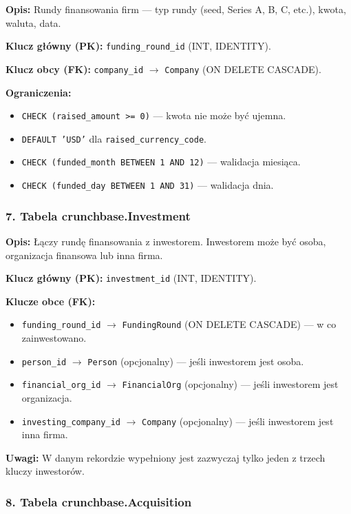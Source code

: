 \documentclass[12pt,a4paper]{article}
\begin{document}
\textbf{Opis:} Rundy finansowania firm --- typ rundy (seed, Series A, B, C, etc.), kwota, waluta, data.

\textbf{Klucz główny (PK):} \texttt{funding\_round\_id} (INT, IDENTITY).

\textbf{Klucz obcy (FK):} \texttt{company\_id} $\rightarrow$ \texttt{Company} (ON DELETE CASCADE).

\textbf{Ograniczenia:}
\begin{itemize}[noitemsep]
    \item \texttt{CHECK (raised\_amount >= 0)} --- kwota nie może być ujemna.
    \item \texttt{DEFAULT 'USD'} dla \texttt{raised\_currency\_code}.
    \item \texttt{CHECK (funded\_month BETWEEN 1 AND 12)} --- walidacja miesiąca.
    \item \texttt{CHECK (funded\_day BETWEEN 1 AND 31)} --- walidacja dnia.
\end{itemize}

\subsubsection{7. Tabela crunchbase.Investment}

\textbf{Opis:} Łączy rundę finansowania z inwestorem. Inwestorem może być osoba, organizacja finansowa lub inna firma.

\textbf{Klucz główny (PK):} \texttt{investment\_id} (INT, IDENTITY).

\textbf{Klucze obce (FK):}
\begin{itemize}[noitemsep]
    \item \texttt{funding\_round\_id} $\rightarrow$ \texttt{FundingRound} (ON DELETE CASCADE) --- w co zainwestowano.
    \item \texttt{person\_id} $\rightarrow$ \texttt{Person} (opcjonalny) --- jeśli inwestorem jest osoba.
    \item \texttt{financial\_org\_id} $\rightarrow$ \texttt{FinancialOrg} (opcjonalny) --- jeśli inwestorem jest organizacja.
    \item \texttt{investing\_company\_id} $\rightarrow$ \texttt{Company} (opcjonalny) --- jeśli inwestorem jest inna firma.
\end{itemize}

\textbf{Uwagi:} W danym rekordzie wypełniony jest zazwyczaj tylko jeden z trzech kluczy inwestorów.

\subsubsection{8. Tabela crunchbase.Acquisition}
\end{document}
